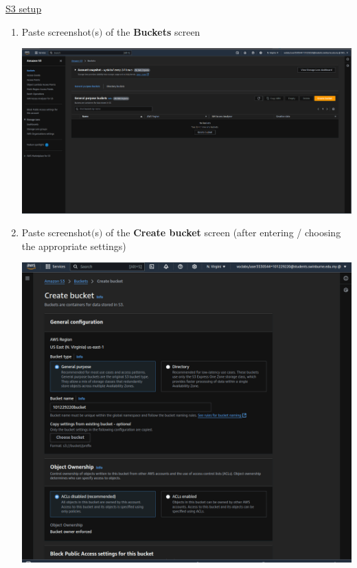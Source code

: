\documentclass[11pt]{article}
\begin{document}
\newpage
\noindent\underline{S3 setup}    
\begin{enumerate}[resume]    
    \item Paste screenshot$($s$)$  of the \textbf{Buckets} screen  \\
    \vspace{5mm}

    {\centering
    \includegraphics[width=5.8in]{pics/32.png}
    }

    
    \item Paste screenshot$($s$)$ of the \textbf{Create bucket} screen (after entering / choosing the appropriate settings)\\
    \vspace{5mm}

    {\centering
    \includegraphics[width=5.8in]{pics/33a.png}
    }


\end{enumerate}
\end{document}
